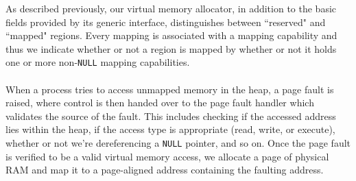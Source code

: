 As described previously, our virtual memory allocator, in addition to the basic fields provided by its generic interface, distinguishes between ``reserved" and ``mapped" regions. Every mapping is associated with a mapping capability and thus we indicate whether or not a region is mapped by whether or not it holds one or more non-\texttt{NULL} mapping capabilities.
\\\\
When a process tries to access unmapped memory in the heap, a page fault is raised, where control is then handed over to the page fault handler which validates the source of the fault. This includes checking if the accessed address lies within the heap, if the access type is appropriate (read, write, or execute), whether or not we're dereferencing a \texttt{NULL} pointer, and so on. Once the page fault is verified to be a valid virtual memory access, we allocate a page of physical RAM and map it to a page-aligned address containing the faulting address. 

